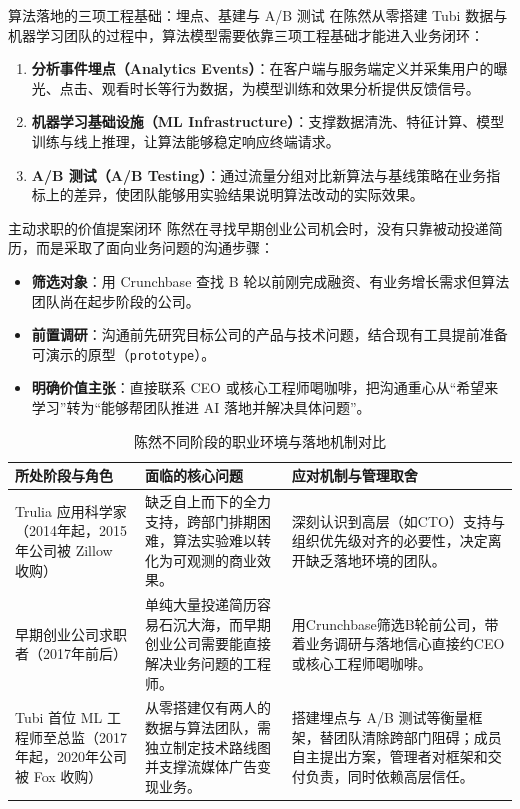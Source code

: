 \documentclass[UTF8,a4paper,11pt,fontset=fandol]{ctexart}
\begin{document}
\begin{knowledgebox}{算法落地的三项工程基础：埋点、基建与 A/B 测试}
在陈然从零搭建 Tubi 数据与机器学习团队的过程中，算法模型需要依靠三项工程基础才能进入业务闭环：
\begin{enumerate}
\item \textbf{分析事件埋点（Analytics Events）}：在客户端与服务端定义并采集用户的曝光、点击、观看时长等行为数据，为模型训练和效果分析提供反馈信号。
\item \textbf{机器学习基础设施（ML Infrastructure）}：支撑数据清洗、特征计算、模型训练与线上推理，让算法能够稳定响应终端请求。
\item \textbf{A/B 测试（A/B Testing）}：通过流量分组对比新算法与基线策略在业务指标上的差异，使团队能够用实验结果说明算法改动的实际效果。
\end{enumerate}
\end{knowledgebox}
\begin{importantbox}{主动求职的价值提案闭环}
陈然在寻找早期创业公司机会时，没有只靠被动投递简历，而是采取了面向业务问题的沟通步骤：
\begin{itemize}
\item \textbf{筛选对象}：用 Crunchbase 查找 B 轮以前刚完成融资、有业务增长需求但算法团队尚在起步阶段的公司。
\item \textbf{前置调研}：沟通前先研究目标公司的产品与技术问题，结合现有工具提前准备可演示的原型（\texttt{prototype}）。
\item \textbf{明确价值主张}：直接联系 CEO 或核心工程师喝咖啡，把沟通重心从“希望来学习”转为“能够帮团队推进 AI 落地并解决具体问题”。
\end{itemize}
\end{importantbox}
\begin{table}[H]\centering\small
\caption{陈然不同阶段的职业环境与落地机制对比}
\begin{tabular}{>{\raggedright\arraybackslash}p{\dimexpr(\linewidth-6\tabcolsep)/3\relax}>{\raggedright\arraybackslash}p{\dimexpr(\linewidth-6\tabcolsep)/3\relax}>{\raggedright\arraybackslash}p{\dimexpr(\linewidth-6\tabcolsep)/3\relax}}
\toprule
所处阶段与角色 & 面临的核心问题 & 应对机制与管理取舍\\\midrule
Trulia 应用科学家（2014年起，2015年公司被 Zillow 收购） & 缺乏自上而下的全力支持，跨部门排期困难，算法实验难以转化为可观测的商业效果。 & 深刻认识到高层（如CTO）支持与组织优先级对齐的必要性，决定离开缺乏落地环境的团队。\\[4pt]
早期创业公司求职者（2017年前后） & 单纯大量投递简历容易石沉大海，而早期创业公司需要能直接解决业务问题的工程师。 & 用Crunchbase筛选B轮前公司，带着业务调研与落地信心直接约CEO或核心工程师喝咖啡。\\[4pt]
Tubi 首位 ML 工程师至总监（2017年起，2020年公司被 Fox 收购） & 从零搭建仅有两人的数据与算法团队，需独立制定技术路线图并支撑流媒体广告变现业务。 & 搭建埋点与 A/B 测试等衡量框架，替团队清除跨部门阻碍；成员自主提出方案，管理者对框架和交付负责，同时依赖高层信任。\\[4pt]
\bottomrule\end{tabular}\end{table}
\end{document}
